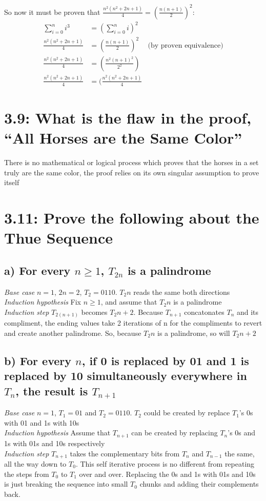 \documentclass{article}
\begin{document}
So now it must be proven that $\frac{n^2(n^2+2n+1)}{4} = (\frac{n(n+1)}{2})^2$:
\begin{align*}
  \sum_{i=0}^n i^3 &= (\sum_{i=0}^n i)^2 \\
  \frac{n^2(n^2+2n+1)}{4} &= (\frac{n(n+1)}{2})^2 &\textrm{(by proven equivalence)} \\
  \frac{n^2(n^2+2n+1)}{4} &= (\frac{n^2(n+1)^2}{2^2}) \\
  \frac{n^2(n^2+2n+1)}{4} &= (\frac{n^2(n^2+2n+1)}{4}
\end{align*}
\section*{3.9: What is the flaw in the proof, ``All Horses are the Same Color''}
There is no mathematical or logical process which proves that the horses in a set truly are the same color, the proof relies on its own singular assumption to prove itself
\section*{3.11: Prove the following about the Thue Sequence}
\subsection*{a) For every $n \geq 1$, $T_{2n}$ is a palindrome}

\emph{Base case} $n = 1$, $2n = 2$, $T_2 = 0110$. $T_2n$ reads the same both directions\\

\emph{Induction hypothesis} Fix $n \geq 1$, and assume that $T_2n$ is a palindrome\\

\emph{Induction step} $T_{2(n+1)}$ becomes $T_2n+2$. Because $T_{n+1}$ concatonates $T_n$ and its compliment, the ending values take 2 iterations of n for the compliments to revert and create another palindrome. So, because $T_2n$ is a palindrome, so will $T_2n+2$
\subsection*{b) For every $n$, if 0 is replaced by 01 and 1 is replaced by 10 simultaneously everywhere in $T_n$, the result is $T_{n+1}$}
\emph{Base case} $n = 1$, $T_1 = 01$ and $T_2 = 0110$. $T_2$ could be created by replace $T_1$'s 0s with 01 and 1s with 10s\\

\emph{Induction hypothesis} Assume that $T_{n+1}$ can be created by replacing $T_n$'s 0s and 1s with 01s and 10s respectively \\

\emph{Induction step} $T_{n+1}$ takes the complementary bits from $T_n$ and $T_{n-1}$ the same, all the way down to $T_0$. This self iterative process is no different from repeating the steps from $T_0$ to $T_1$ over and over. Replacing the 0s and 1s with 01s and 10s is just breaking the sequence into small $T_0$ chunks and adding their complements back.
\end{document}
